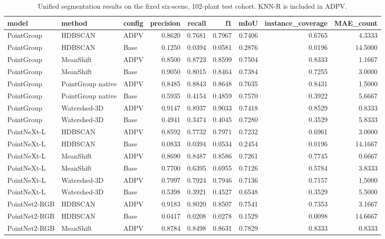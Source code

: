 \begin{table}
\caption{Unified segmentation results on the fixed six-scene, 102-plant test cohort. KNN-R is included in ADPV.}
\label{tab:main_fixed_cohort}
\begin{tabular}{lllrrrrrr}
\toprule
model & method & config & precision & recall & f1 & mIoU & instance\_coverage & MAE\_count \\
\midrule
PointGroup & HDBSCAN & ADPV & 0.8620 & 0.7681 & 0.7967 & 0.7406 & 0.6765 & 4.3333 \\
PointGroup & HDBSCAN & Base & 0.1250 & 0.0394 & 0.0581 & 0.2876 & 0.0196 & 14.5000 \\
PointGroup & MeanShift & ADPV & 0.8500 & 0.8723 & 0.8599 & 0.7504 & 0.8333 & 1.1667 \\
PointGroup & MeanShift & Base & 0.9050 & 0.8015 & 0.8464 & 0.7384 & 0.7255 & 3.0000 \\
PointGroup & PointGroup native & ADPV & 0.8485 & 0.8843 & 0.8648 & 0.7635 & 0.8431 & 1.5000 \\
PointGroup & PointGroup native & Base & 0.5935 & 0.4154 & 0.4859 & 0.7570 & 0.3922 & 5.6667 \\
PointGroup & Watershed-3D & ADPV & 0.9147 & 0.8937 & 0.9033 & 0.7418 & 0.8529 & 0.8333 \\
PointGroup & Watershed-3D & Base & 0.4941 & 0.3474 & 0.4045 & 0.7280 & 0.3529 & 5.8333 \\
PointNeXt-L & HDBSCAN & ADPV & 0.8592 & 0.7732 & 0.7971 & 0.7232 & 0.6961 & 3.0000 \\
PointNeXt-L & HDBSCAN & Base & 0.0833 & 0.0394 & 0.0534 & 0.2454 & 0.0196 & 14.1667 \\
PointNeXt-L & MeanShift & ADPV & 0.8690 & 0.8487 & 0.8586 & 0.7261 & 0.7745 & 0.6667 \\
PointNeXt-L & MeanShift & Base & 0.7700 & 0.6395 & 0.6955 & 0.7126 & 0.5784 & 3.8333 \\
PointNeXt-L & Watershed-3D & ADPV & 0.7997 & 0.7924 & 0.7946 & 0.7136 & 0.7157 & 1.5000 \\
PointNeXt-L & Watershed-3D & Base & 0.5398 & 0.3921 & 0.4527 & 0.6548 & 0.3529 & 5.5000 \\
PointNet2-RGB & HDBSCAN & ADPV & 0.9183 & 0.8020 & 0.8507 & 0.7541 & 0.7353 & 3.1667 \\
PointNet2-RGB & HDBSCAN & Base & 0.0417 & 0.0208 & 0.0278 & 0.1529 & 0.0098 & 14.6667 \\
PointNet2-RGB & MeanShift & ADPV & 0.8784 & 0.8498 & 0.8631 & 0.7829 & 0.8333 & 0.8333 \\

\end{tabular}
\end{table}
